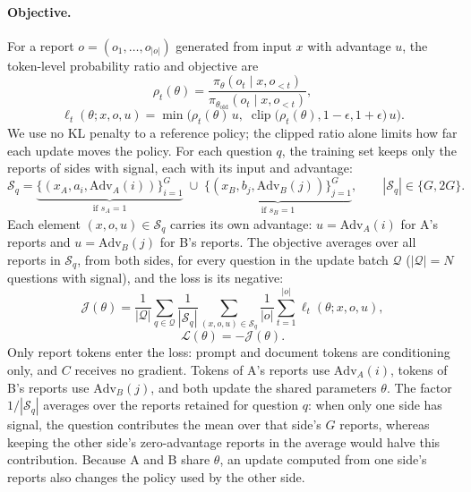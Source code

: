 \documentclass[11pt]{article}
\DeclareMathOperator{\clip}{clip}
\begin{document}
\paragraph{Objective.}
For a report $o = (o_1, \dots, o_{|o|})$ generated from input $x$ with
advantage $u$, the token-level probability ratio and objective are
\begin{equation}
  \rho_t(\theta) =
  \frac{\pi_\theta(o_t \mid x, o_{<t})}{\pi_{\theta_{\mathrm{old}}}(o_t \mid x, o_{<t})},
  \label{eq:ratio}
\end{equation}
\begin{equation}
  \ell_t(\theta; x, o, u) =
  \min\!\Big(\rho_t(\theta)\,u,\;
  \clip\big(\rho_t(\theta), 1-\epsilon, 1+\epsilon\big)\,u\Big).
  \label{eq:token}
\end{equation}
We use no KL penalty to a reference policy; the clipped ratio alone limits
how far each update moves the policy.
For each question $q$, the training set keeps only the reports of sides
with signal, each with its input and advantage:
\begin{equation}
  \mathcal{S}_q =
  \underbrace{\{(x_A, a_i, \mathrm{Adv}_A(i))\}_{i=1}^{G}}_{\text{if } s_A = 1}
  \;\cup\;
  \underbrace{\{(x_B, b_j, \mathrm{Adv}_B(j))\}_{j=1}^{G}}_{\text{if } s_B = 1},
  \qquad |\mathcal{S}_q| \in \{G, 2G\}.
  \label{eq:set}
\end{equation}
Each element $(x, o, u) \in \mathcal{S}_q$ carries its own advantage:
$u = \mathrm{Adv}_A(i)$ for A's reports and $u = \mathrm{Adv}_B(j)$ for B's
reports. The objective averages over all reports in $\mathcal{S}_q$,
from both sides, for every question in the update batch $\mathcal{Q}$
($|\mathcal{Q}| = N$ questions with signal), and the loss is its negative:
\begin{equation}
  \mathcal{J}(\theta) =
  \frac{1}{|\mathcal{Q}|}\sum_{q \in \mathcal{Q}}
  \frac{1}{|\mathcal{S}_q|}
  \sum_{(x, o, u) \in \mathcal{S}_q}
  \frac{1}{|o|}\sum_{t=1}^{|o|} \ell_t(\theta; x, o, u),
  \label{eq:objective}
\end{equation}
\begin{equation}
  \mathcal{L}(\theta) = -\mathcal{J}(\theta).
  \label{eq:loss}
\end{equation}
Only report tokens enter the loss: prompt and document tokens are
conditioning only, and $C$ receives no gradient. Tokens of A's reports use
$\mathrm{Adv}_A(i)$, tokens of B's reports use $\mathrm{Adv}_B(j)$, and both
update the shared parameters $\theta$. The factor $1/|\mathcal{S}_q|$
averages over the reports retained for question $q$: when only one side has
signal, the question contributes the mean over that side's $G$ reports,
whereas keeping the other side's zero-advantage reports in the average would
halve this contribution. Because A and B share $\theta$, an update computed
from one side's reports also changes the policy used by the other side.
\end{document}

